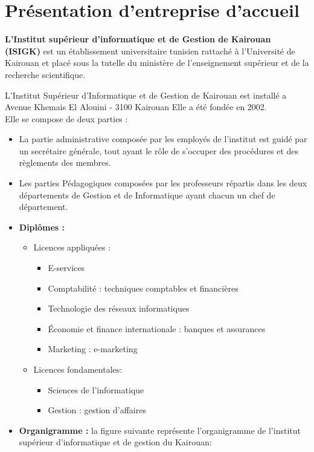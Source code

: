 \documentclass[12 pt ]{report}
\begin{document}
\section{Présentation d’entreprise d’accueil }

\textbf{ L'Institut supérieur d'informatique et de Gestion de Kairouan (ISIGK) }est un établissement universitaire tunisien rattaché à l'Université de Kairouan et placé sous la tutelle
du ministère de l'enseignement supérieur et de la recherche scientifique.\cite{isigk}

L’Institut Supérieur d’Informatique et de Gestion de Kairouan est installé a Avenue
Khemais El Alouini - 3100 Kairouan Elle a été fondée en 2002.
\\
Elle se compose de deux parties :
\\
\begin{itemize}[font=\color{Indigo} \Large, label=]
\item La partie administrative composée par les employés de l’institut est guidé par un
secrétaire générale, tout ayant le rôle de s’occuper des procédures et des règlements des
membres. 
\item Les parties Pédagogiques composées par les professeurs répartis dans les deux
départements de Gestion et de Informatique ayant chacun un chef de département. 

\end{itemize}
\begin{itemize}[font=\color{Indigo} \Large, label=]

\item\textbf{Diplômes :}




\begin{itemize}[font=\color{Indigo} \Large, label=]
\item Licences appliquées :


\begin{itemize}[font=\color{Indigo} \Large, label=]

	\item E-services
	\item Comptabilité : techniques comptables et financières
	\item Technologie des réseaux informatiques
	\item Économie et finance internationale : banques et assurances
	\item Marketing : e-marketing

\end{itemize}
\item Licences fondamentales:
\begin{itemize}[font=\color{Indigo} \Large, label=]

\item Sciences de l'informatique
\item Gestion : gestion d'affaires
\end{itemize}
\end{itemize}
\item \textbf{Organigramme :}	
la figure suivante représente l'organigramme de l'institut supérieur d'informatique et de gestion du Kairouan:
\end{itemize}
\end{document}
